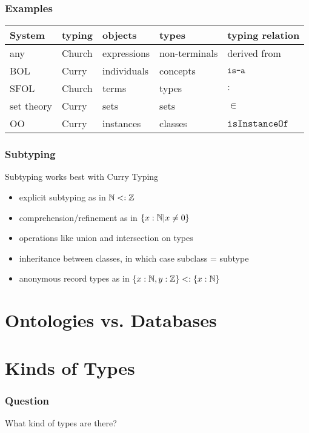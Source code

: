 \begin{frame}\frametitle{Examples}
\begin{center}
\begin{tabular}{l|llll}
System & typing & objects & types & typing relation\\
\hline
any & Church & expressions & non-terminals & derived from\\
BOL & Curry  & individuals & concepts & $\mathop{\texttt{is-a}}$\\
SFOL & Church & terms & types & $:$ \\
set theory & Curry & sets & sets & $\in$ \\
OO & Curry & instances & classes & $\mathtt{isInstanceOf}$\\
\end{tabular}
\end{center}
\end{frame}

\begin{frame}\frametitle{Subtyping}
Subtyping works best with Curry Typing
\begin{itemize}
 \item explicit subtyping as in $\mathbb{N}<:\mathbb{Z}$
 \item comprehension/refinement as in $\{x:\mathbb{N}|x\neq 0\}$
 \item operations like union and intersection on types
 \item inheritance between classes, in which case subclass = subtype
 \item anonymous record types as in $\{x:\mathbb{N},y:\mathbb{Z}\}<:\{x:\mathbb{N}\}$
\end{itemize}
\end{frame}


\section{Ontologies vs. Databases}



\section{Kinds of Types}

\begin{frame}\frametitle{Question}
What kind of types are there?
\end{frame}

